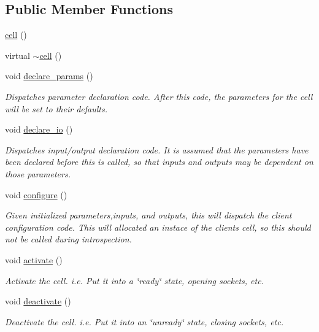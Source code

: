 \subsection*{Public Member Functions}
\begin{DoxyCompactItemize}
\item 
\hyperlink{structecto_1_1cell_a782c9d0f521f8a34c8eed309d0d8d79a}{cell} ()
\item 
virtual \hyperlink{structecto_1_1cell_a98748014df1b1a4fd3fbb47f6adc8c5e}{$\sim$cell} ()
\item 
void \hyperlink{structecto_1_1cell_a5c3c204f531de15920cb9d3db3ecfc4c}{declare\-\_\-params} ()
\begin{DoxyCompactList}\small\item\em Dispatches parameter declaration code. After this code, the parameters for the cell will be set to their defaults. \end{DoxyCompactList}\item 
void \hyperlink{structecto_1_1cell_af6c3782ed0d1c258bcf5050b4af272b4}{declare\-\_\-io} ()
\begin{DoxyCompactList}\small\item\em Dispatches input/output declaration code. It is assumed that the parameters have been declared before this is called, so that inputs and outputs may be dependent on those parameters. \end{DoxyCompactList}\item 
void \hyperlink{structecto_1_1cell_a30d48d21d6ffa86af4888f78e92241af}{configure} ()
\begin{DoxyCompactList}\small\item\em Given initialized parameters,inputs, and outputs, this will dispatch the client configuration code. This will allocated an instace of the clients cell, so this should not be called during introspection. \end{DoxyCompactList}\item 
void \hyperlink{structecto_1_1cell_a0416d7265db282a18202b58636be7165}{activate} ()
\begin{DoxyCompactList}\small\item\em Activate the cell. i.\-e. Put it into a \char`\"{}ready\char`\"{} state, opening sockets, etc. \end{DoxyCompactList}\item 
void \hyperlink{structecto_1_1cell_ab988f785fb943af3ff48c2d6f67a07aa}{deactivate} ()
\begin{DoxyCompactList}\small\item\em Deactivate the cell. i.\-e. Put it into an \char`\"{}unready\char`\"{} state, closing sockets, etc. \end{DoxyCompactList}\item 

\end{DoxyCompactItemize}
